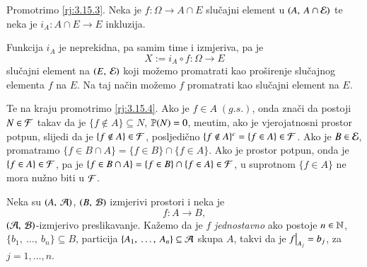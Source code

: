 \begin{rj}[\ref{zad:3.15}]
    Promotrimo \ref{rj:3.15.3}.
    Neka je $f: \Omega \to A \cap E$ slu\v cajni element u $({A}, \: {A \cap \mathcal{E}})$ te neka je $i_A : A \cap E \to E$ inkluzija.
    \begin{figure}[H]
        \centering
    \end{figure}
    Funkcija $i_A$ je neprekidna, pa samim time i izmjeriva, pa je
    \begin{equation*}
        X := i_A \circ f : \Omega \to E
    \end{equation*}
    slu\v cajni element na $({E}, \: {\mathcal{E}})$ koji mo\v zemo promatrati kao pro\v sirenje slu\v cajnog elementa $f$ na $E$.
    Na taj na\v cin mo\v zemo $f$ promatrati kao slu\v cajni element na $E$.

    Te na kraju promotrimo \ref{rj:3.15.4}.
    Ako je $f \in A \; (g.s.)$, onda zna\v ci da postoji $N \in \mathcal{F}$ takav da je $\{f \notin A\} \subseteq N$, $\mathbb{P}({N}) = 0$, me\dj utim, ako je vjerojatnosni prostor potpun, slijedi da je $\{f \notin A\} \in \mathcal{F}$, posljedi\v cno $\{f \notin A\}^c = \{f \in A\} \in \mathcal{F}$.
    Ako je $B \in \mathcal{E}$, promatramo $\{f \in B \cap A\} = \{ f \in B \} \cap \{f \in A\}$.
    Ako je prostor potpun, onda je $\{f \in A\} \in \mathcal{F}$, pa je $\{f \in B \cap A\} = \{ f \in B \} \cap \{f \in A\} \in \mathcal{F}$, u suprotnom $\{f \in A\}$ ne mora nu\v zno biti u $\mathcal{F}$.
\end{rj}


\begin{defn}    \label{defn:3.15-1}
    Neka su $({A}, \: {\mathcal{A}})$, $({B}, \: {\mathcal{B}})$ izmjerivi prostori i neka je
    \begin{equation*}
        f: A \to B,    
    \end{equation*}
    $({\mathcal{A}}, \: {\mathcal{B}})$-izmjerivo preslikavanje.
    Ka\v zemo da je $f$ \emph{jednostavno} ako postoje $n \in \mathbb{N}$, $\{ b_1, \: \dots, \: b_n \} \subseteq B$, particija $\{ A_1, \: \dots, \: A_n \} \subseteq \mathcal{A}$ skupa $A$, takvi da je $\restr{f}{A_j} = b_j$, za $j = 1, \dots, n$.
\end{defn}
    

